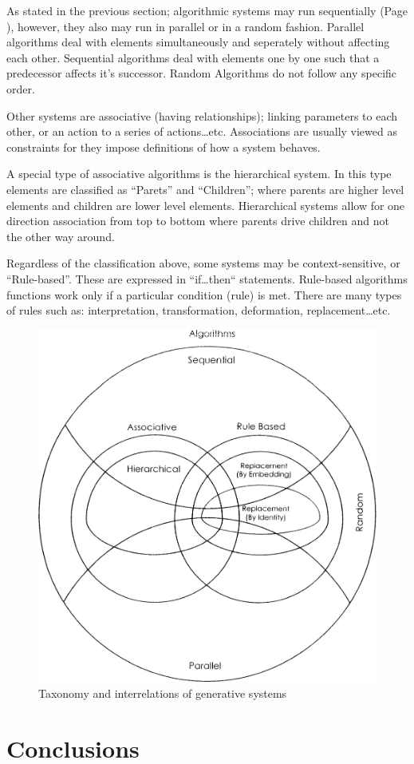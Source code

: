 As stated in the previous section; algorithmic systems may run sequentially (Page \pageref{SequentialAlgorithms}), however, they also may run in parallel or in a random fashion. Parallel algorithms deal with elements simultaneously and seperately without affecting each other. Sequential algorithms deal with elements one by one such that a predecessor affects it's successor. Random Algorithms do not follow any specific order. \cite{khaldi04}

Other systems are associative (having relationships); linking parameters to each other, or an action to a series of actions\ldots etc. Associations are usually viewed as constraints for they impose definitions of how a system behaves. \cite{khaldi04}

A special type of associative algorithms is the hierarchical system. In this type elements are classified as ``Parets'' and ``Children''; where parents are higher level elements and children are lower level elements. Hierarchical systems allow for one direction association from top to bottom where parents drive children and not the other way around. \cite{khaldi04}

Regardless of the classification above, some systems may be context-sensitive, or ``Rule-based''. These are expressed in ``if\ldots then`` statements. Rule-based algorithms functions work only if a particular condition (rule) is met. There are many types of rules such as: interpretation, transformation, deformation, replacement\ldots etc. \cite{khaldi04}

\begin{figure}[htbp]
\begin{center}
\includegraphics[width=\textwidth]{./Images/1-Taxonomy}
\end{center}
\caption[Taxonomy of Generative Systems]{Taxonomy and interrelations of generative systems \cite{khaldi04}}
\label{fig:Taxonomy}
\end{figure}

\section{Conclusions}


